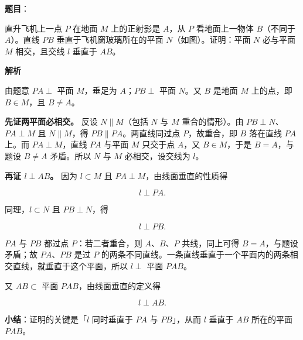 \begin{answer}

\textbf{题目}：

直升飞机上一点 $P$ 在地面 $M$ 上的正射影是 $A$，从 $P$ 看地面上一物体 $B$（不同于 $A$）。直线 $PB$ 垂直于飞机窗玻璃所在的平面 $N$（如图）。证明：平面 $N$ 必与平面 $M$ 相交，且交线 $l$ 垂直于 $AB$。
\nopagebreak[4]
\begin{center}\end{center}
\nopagebreak[4]
\textbf{解析}
\nopagebreak[4]
\begin{center}\end{center}
\nopagebreak[4]
由题意 $PA\perp$ 平面 $M$，垂足为 $A$；$PB\perp$ 平面 $N$。又 $B$ 是地面 $M$ 上的点，即 $B\in M$，且 $B\neq A$。

\textbf{先证两平面必相交。} 反设 $N\parallel M$（包括 $N$ 与 $M$ 重合的情形）。由 $PB\perp N$、$PA\perp M$ 且 $N\parallel M$，得 $PB\parallel PA$。两直线同过点 $P$，故重合，即 $B$ 落在直线 $PA$ 上。而 $PA\perp M$，直线 $PA$ 与平面 $M$ 只交于点 $A$，又 $B\in M$，于是 $B=A$，与题设 $B\neq A$ 矛盾。所以 $N$ 与 $M$ 必相交，设交线为 $l$。

\textbf{再证 $l\perp AB$。} 因为 $l\subset M$ 且 $PA\perp M$，由线面垂直的性质得

\nopagebreak[4]
\[
l\perp PA.
\]

同理，$l\subset N$ 且 $PB\perp N$，得

\nopagebreak[4]
\[
l\perp PB.
\]

$PA$ 与 $PB$ 都过点 $P$：若二者重合，则 $A$、$B$、$P$ 共线，同上可得 $B=A$，与题设矛盾；故 $PA$、$PB$ 是过 $P$ 的两条不同直线。一条直线垂直于一个平面内的两条相交直线，就垂直于这个平面，所以 $l\perp$ 平面 $PAB$。

又 $AB\subset$ 平面 $PAB$，由线面垂直的定义得

\nopagebreak[4]
\[
l\perp AB.
\]

\textbf{小结}：证明的关键是「$l$ 同时垂直于 $PA$ 与 $PB$」，从而 $l$ 垂直于 $AB$ 所在的平面 $PAB$。


\end{answer}
